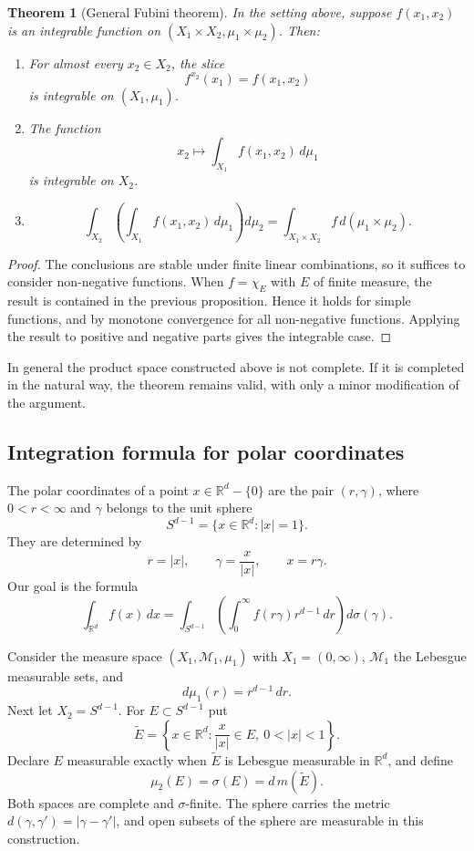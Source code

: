 \documentclass[11pt,openany]{book}
\newtheorem{theorem}{Theorem}[section]
\begin{document}
\begin{theorem}[General Fubini theorem]
In the setting above, suppose $f(x_1,x_2)$ is an integrable function on $(X_1\times X_2,\mu_1\times\mu_2)$. Then:
\begin{enumerate}
\item[(i)] For almost every $x_2\in X_2$, the slice
\[
f^{x_2}(x_1)=f(x_1,x_2)
\]
is integrable on $(X_1,\mu_1)$.
\item[(ii)] The function
\[
x_2\longmapsto\int_{X_1}f(x_1,x_2)\,d\mu_1
\]
is integrable on $X_2$.
\item[(iii)]
\[
\int_{X_2}\left(\int_{X_1}f(x_1,x_2)\,d\mu_1\right)d\mu_2
=\int_{X_1\times X_2}f\,d(\mu_1\times\mu_2).
\]
\end{enumerate}
\end{theorem}

\begin{proof}
The conclusions are stable under finite linear combinations, so it suffices to consider non-negative functions. When $f=\chi_E$ with $E$ of finite measure, the result is contained in the previous proposition. Hence it holds for simple functions, and by monotone convergence for all non-negative functions. Applying the result to positive and negative parts gives the integrable case.
\end{proof}

In general the product space constructed above is not complete. If it is completed in the natural way, the theorem remains valid, with only a minor modification of the argument.

\subsection{Integration formula for polar coordinates}

The polar coordinates of a point $x\in\mathbb R^d-\{0\}$ are the pair $(r,\gamma)$, where $0<r<\infty$ and $\gamma$ belongs to the unit sphere
\[
S^{d-1}=\{x\in\mathbb R^d:|x|=1\}.
\]
They are determined by
\begin{equation}
r=|x|,
\qquad
\gamma=\frac{x}{|x|},
\qquad
x=r\gamma.
\tag{8}
\end{equation}
Our goal is the formula
\begin{equation}
\int_{\mathbb R^d}f(x)\,dx
=\int_{S^{d-1}}\left(\int_0^{\infty}f(r\gamma)r^{d-1}\,dr\right)d\sigma(\gamma).
\tag{9}
\end{equation}

Consider the measure space $(X_1,\mathcal M_1,\mu_1)$ with $X_1=(0,\infty)$, $\mathcal M_1$ the Lebesgue measurable sets, and
\[
d\mu_1(r)=r^{d-1}\,dr.
\]
Next let $X_2=S^{d-1}$. For $E\subset S^{d-1}$ put
\[
\widetilde E=\left\{x\in\mathbb R^d:\frac{x}{|x|}\in E,\ 0<|x|<1\right\}.
\]
Declare $E$ measurable exactly when $\widetilde E$ is Lebesgue measurable in $\mathbb R^d$, and define
\[
\mu_2(E)=\sigma(E)=d\,m(\widetilde E).
\]
Both spaces are complete and $\sigma$-finite. The sphere carries the metric $d(\gamma,\gamma')=|\gamma-\gamma'|$, and open subsets of the sphere are measurable in this construction.
\end{document}
